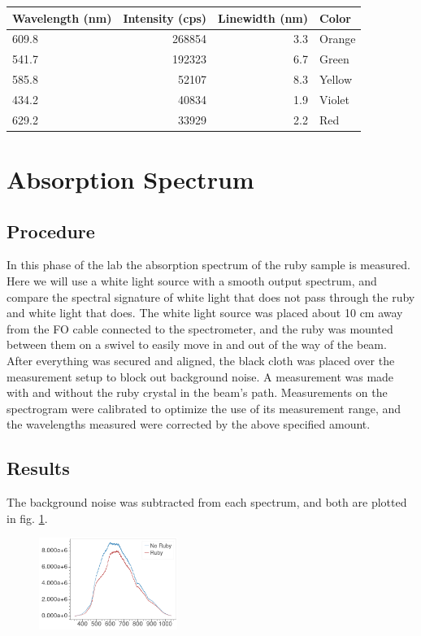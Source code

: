 \documentclass[aps,prl,reprint]{revtex4-2}
\begin{document}
\begin{table}[h]
\begin{tabular}{lrrl}
\toprule
Wavelength (nm) &  Intensity (cps) &  Linewidth (nm) &   Color \\
\hline
609.8 &     268854 &    3.3 &  Orange \\
541.7 &     192323 &    6.7 &   Green \\
585.8 &      52107 &    8.3 &  Yellow \\
434.2 &      40834 &    1.9 &  Violet \\
629.2 &      33929 &    2.2 &     Red \\\hline
\hline
\end{tabular}
\label{widths}
\end{table}

\section{Absorption Spectrum}

\subsection{Procedure}
In this phase of the lab the absorption spectrum of the ruby sample is measured. Here
we will use a white light source with a smooth output spectrum, and compare the
spectral signature of white light that does not pass through the ruby and white light
that does. The white light source was placed about 10 cm away from the FO cable 
connected to the spectrometer, and the ruby was mounted between them on a swivel to 
easily move in and out of the way of the beam. After everything was secured and aligned,
the black cloth was placed over the measurement setup to block out background noise. 
A measurement was made with and without the ruby crystal in the beam's path.
Measurements on the spectrogram were calibrated to optimize the use of its measurement
range, and the wavelengths measured were corrected by the above specified amount.


\subsection{Results}
The background noise was subtracted from each spectrum, and both are plotted in fig. \ref{ruby-no-ruby}.

\begin{figure}[h]
\includegraphics[width=0.4\textwidth]{../Images/l3_B_a.png}
\caption{\label{ruby-no-ruby}}
\end{figure}
\end{document}
